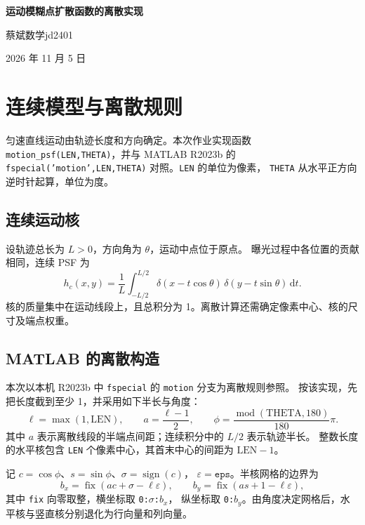 \documentclass[UTF8,12pt,a4paper]{ctexart}
\begin{document}
\begin{center}
{\LARGE\bfseries 运动模糊点扩散函数的离散实现}\par\vspace{9pt}
蔡斌\quad 数学jd2401\par\vspace{3pt}
2026 年 11 月 5 日
\end{center}

\section{连续模型与离散规则}
匀速直线运动由轨迹长度和方向确定。本次作业实现函数
\texttt{motion\_psf(LEN,THETA)}，并与 MATLAB R2023b 的
\texttt{fspecial('motion',LEN,THETA)} 对照。\texttt{LEN} 的单位为像素，
\texttt{THETA} 从水平正方向逆时针起算，单位为度\cite{doc}。

\subsection{连续运动核}
设轨迹总长为 $L>0$，方向角为 $\theta$，运动中点位于原点。
曝光过程中各位置的贡献相同，连续 PSF 为
\begin{equation}
 h_c(x,y)=\frac{1}{L}\int_{-L/2}^{L/2}
 \delta(x-t\cos\theta)\,\delta(y-t\sin\theta)\,\mathrm dt.
\end{equation}
核的质量集中在运动线段上，且总积分为 1。离散计算还需确定像素中心、核的尺寸及端点权重。

\subsection{MATLAB 的离散构造}
本次以本机 R2023b 中 \texttt{fspecial} 的 \texttt{motion} 分支为离散规则参照\cite{local}。
按该实现，先把长度截到至少 1，并采用如下半长与角度：
\begin{equation}
 \ell=\max(1,\mathrm{LEN}),\qquad a=\frac{\ell-1}{2},\qquad
 \phi=\frac{\operatorname{mod}(\mathrm{THETA},180)}{180}\pi.
\end{equation}
其中 $a$ 表示离散线段的半端点间距；连续积分中的 $L/2$ 表示轨迹半长。
整数长度的水平核包含 \texttt{LEN} 个像素中心，其首末中心的间距为 $\mathrm{LEN}-1$。

记 $c=\cos\phi$、$s=\sin\phi$、$\sigma=\operatorname{sign}(c)$，
$\varepsilon=\texttt{eps}$。半核网格的边界为
\begin{equation}
 b_x=\operatorname{fix}(ac+\sigma-\ell\varepsilon),\qquad
 b_y=\operatorname{fix}(as+1-\ell\varepsilon),
\end{equation}
其中 \texttt{fix} 向零取整，横坐标取 \texttt{0:}$\sigma$\texttt{:}$b_x$，
纵坐标取 \texttt{0:}$b_y$。由角度决定网格后，水平核与竖直核分别退化为行向量和列向量。
\end{document}
